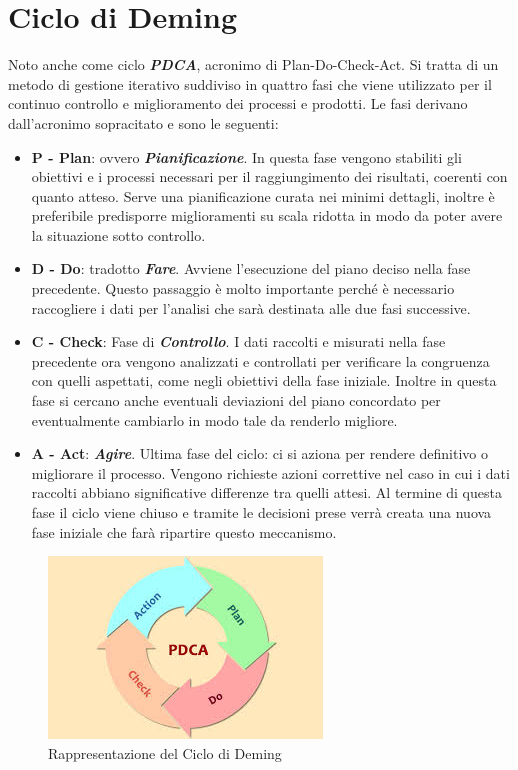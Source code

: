 \chapter{Ciclo di Deming}\label{CicloDiDeming}
Noto anche come ciclo \textbf{\textit{PDCA}}, acronimo di Plan-Do-Check-Act.
Si tratta di un metodo di gestione iterativo suddiviso in quattro fasi che viene utilizzato per il continuo controllo e miglioramento dei processi e prodotti.
Le fasi derivano dall'acronimo sopracitato e sono le seguenti:
\begin{itemize}
	\item \textbf{P - Plan}:  ovvero \textbf{\textit{Pianificazione}}. In questa fase vengono stabiliti gli obiettivi e i processi necessari per il raggiungimento dei risultati, coerenti con quanto atteso.
	Serve una pianificazione curata nei minimi dettagli, inoltre è preferibile predisporre miglioramenti su scala ridotta in modo da poter avere la situazione sotto controllo.
	\item \textbf{D - Do}: tradotto \textbf{\textit{Fare}}. Avviene l’esecuzione del piano deciso nella fase precedente.
	Questo passaggio è molto importante perché è necessario raccogliere i dati per l’analisi che sarà destinata alle due fasi successive.
	\item \textbf{C - Check}: Fase di \textbf{\textit{Controllo}}. I dati raccolti e misurati nella fase precedente ora vengono analizzati e controllati per verificare la congruenza con quelli aspettati, come negli obiettivi della fase iniziale.
	Inoltre in questa fase si cercano anche eventuali deviazioni del piano concordato per eventualmente cambiarlo in modo tale da renderlo migliore.
	\item \textbf{A - Act}: \textbf{\textit{Agire}}. Ultima fase del ciclo: ci si aziona per rendere definitivo o migliorare il processo. Vengono richieste azioni correttive nel caso in cui i dati raccolti abbiano significative differenze tra quelli attesi. 
	Al termine di questa fase il ciclo viene chiuso e tramite le decisioni prese verrà creata una nuova fase iniziale che farà ripartire questo meccanismo.
\end{itemize}
\begin{figure}[!ht]
	\begin{center}
		\includegraphics[width=0.48\linewidth]{../immagini/Ciclo_di_Deming.jpg}
		\caption{Rappresentazione del Ciclo di Deming}
	\end{center}
\end{figure}
